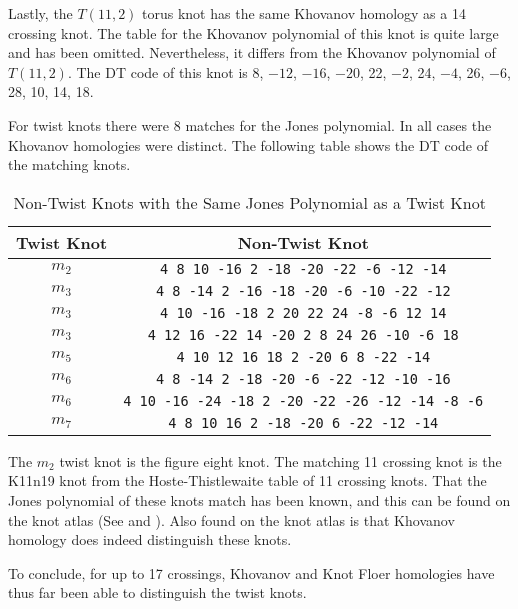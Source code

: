 \documentclass{article}
\theoremstyle{plain}
\begin{document}
        Lastly, the $T(11,2)$ torus knot has the same Khovanov homology as a
        14 crossing knot. The table for the Khovanov polynomial of this knot
        is quite large and has been omitted. Nevertheless, it differs from the
        Khovanov polynomial of $T(11,2)$. The DT code of this knot is
        8, $-12$, $-16$, $-20$, 22, $-2$, 24, $-4$, 26, $-6$, 28, 10, 14, 18.
        \par\hfill\par
        For twist knots there were 8 matches for the Jones polynomial. In all
        cases the Khovanov homologies were distinct. The following table shows
        the DT code of the matching knots.
        \begin{table}[H]
            \centering
            \begin{tabular}{| c | c |}
                \hline
                Twist Knot&Non-Twist Knot\\
                \hline
                $m_{2}$&\texttt{4 8 10 -16 2 -18 -20 -22 -6 -12 -14}\\
                \hline
                $m_{3}$&\texttt{4 8 -14 2 -16 -18 -20 -6 -10 -22 -12}\\
                \hline
                $m_{3}$&\texttt{4 10 -16 -18 2 20 22 24 -8 -6 12 14}\\
                \hline
                $m_{3}$&\texttt{4 12 16 -22 14 -20 2 8 24 26 -10 -6 18}\\
                \hline
                $m_{5}$&\texttt{4 10 12 16 18 2 -20 6 8 -22 -14}\\
                \hline
                $m_{6}$&\texttt{4 8 -14 2 -18 -20 -6 -22 -12 -10 -16}\\
                \hline
                $m_{6}$&\texttt{4 10 -16 -24 -18 2 -20 -22 -26 -12 -14 -8 -6}\\
                \hline
                $m_{7}$&\texttt{4 8 10 16 2 -18 -20 6 -22 -12 -14}\\
                \hline
            \end{tabular}
            \caption{Non-Twist Knots with the Same Jones Polynomial as a Twist Knot}
        \end{table}
        The $m_{2}$ twist knot is the figure eight knot. The matching 11
        crossing knot is the K11n19 knot from the
        Hoste-Thistlewaite table of 11 crossing knots. That the Jones polynomial
        of these knots match has been known, and this can be found on the
        knot atlas (See \cite{KatlasFigureEight} and \cite{KatlasK11n19}). Also
        found on the knot atlas is that Khovanov homology does indeed
        distinguish these knots.
        \par\hfill\par
        To conclude, for up to 17 crossings, Khovanov and Knot Floer homologies
        have thus far been able to distinguish the twist knots.
\end{document}
